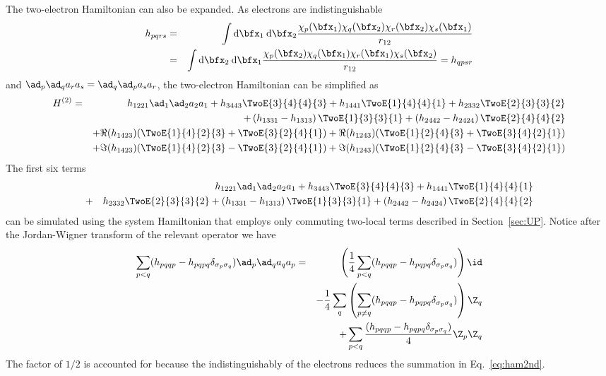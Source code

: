 \documentclass[11pt,oneside,final]{huthesis}%
\begin{document}
The two-electron Hamiltonian can also be expanded. As electrons are indistinguishable
\begin{eqnarray*}
h_{pqrs}&=&\int \textrm{d}\bfx_1\:\textrm{d}\bfx_2 \frac{\chi_p(\bfx_1)\chi_q(\bfx_2)\chi_r(\bfx_2)\chi_s(\bfx_1)  }{r_{12}}\\
	  &=&\int \textrm{d}\bfx_2\:\textrm{d}\bfx_1 \frac{\chi_p(\bfx_2)\chi_q(\bfx_1)\chi_r(\bfx_1)\chi_s(\bfx_2)  }{r_{12}}
	  =h_{qpsr}
\end{eqnarray*}
and $\ad_p\ad_qa_ra_s=\ad_q\ad_pa_sa_r$, the two-electron Hamiltonian can be simplified as
\begin{eqnarray*}
	H^{(2)}&=&h_{1221}\ad_1\ad_2a_2a_1+
	h_{3443}\TwoE{3}{4}{4}{3}+h_{1441}\TwoE{1}{4}{4}{1}	+h_{2332}\TwoE{2}{3}{3}{2}\nonumber\\
	&&+\left(h_{1331}-h_{1313}\right)\TwoE{1}{3}{3}{1} +\left( h_{2442} -h_{2424}\right)\TwoE{2}{4}{4}{2}\nonumber\\
	&&+
	 \Re(h_{1423})(\TwoE{1}{4}{2}{3}+\TwoE{3}{2}{4}{1})+\Re(h_{1243})(\TwoE{1}{2}{4}{3}+\TwoE{3}{4}{2}{1})\nonumber\\
	&& +\Im(h_{1423})(\TwoE{1}{4}{2}{3}-\TwoE{3}{2}{4}{1})+\Im(h_{1243})(\TwoE{1}{2}{4}{3}-\TwoE{3}{4}{2}{1})
\end{eqnarray*}
The first six terms  
\begin{eqnarray*}
	 &&h_{1221}\ad_1\ad_2a_2a_1+h_{3443}\TwoE{3}{4}{4}{3}+h_{1441}\TwoE{1}{4}{4}{1}\\
	&+&h_{2332}\TwoE{2}{3}{3}{2}+\left(h_{1331}-h_{1313}\right)\TwoE{1}{3}{3}{1} +\left( h_{2442} -h_{2424}\right)\TwoE{2}{4}{4}{2}
\end{eqnarray*}
can be simulated using the system Hamiltonian that employs only commuting two-local terms described in Section~\ref{sec:UP}.
Notice after the Jordan-Wigner transform of the relevant operator we have
\begin{eqnarray}
\sum_{p<q}(h_{pqqp}-h_{pqpq}\delta_{\sigma_p\sigma_q})\ad_p\ad_qa_q a_p
			   &=& \left(\frac{1}{4}\sum_{p<q}(h_{pqqp}-h_{pqpq}\delta_{\sigma_p\sigma_q})\right)\id\nonumber\\
			     && -\frac{1}{4}\sum_{q}\left(\sum_{p\neq q}(h_{pqqp}-h_{pqpq}\delta_{\sigma_p\sigma_q})\right)\Z_q\nonumber\\
			     &&+\sum_{p<q}\frac{(h_{pqqp}-h_{pqpq}\delta_{\sigma_p\sigma_q})}{4}\Z_p\Z_q
	\label{eq:2eSimple}
\end{eqnarray}
The factor of $1/2$ is accounted for because the indistinguishably of the electrons reduces the summation in Eq.~\eqref{eq:ham2nd}.
\end{document}
